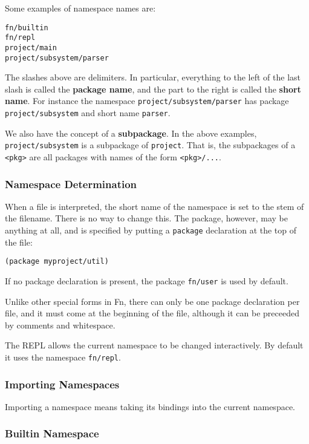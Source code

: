 \documentclass[11pt]{article}
\begin{document}
Some examples of namespace names are:
\begin{verbatim}
fn/builtin
fn/repl
project/main
project/subsystem/parser
\end{verbatim}

The slashes above are delimiters. In particular, everything to the left of the
last slash is called the \textbf{package name}, and the part to the right is called the
\textbf{short name}. For instance the namespace \texttt{project/subsystem/parser} has package
\texttt{project/subsystem} and short name \texttt{parser}.

We also have the concept of a \textbf{subpackage}. In the above examples,
\texttt{project/subsystem} is a subpackage of \texttt{project}. That is, the subpackages of a
\texttt{<pkg>} are all packages with names of the form \texttt{<pkg>/...}.


\subsubsection{Namespace Determination}
\label{sec:orgf0cd9c9}

When a file is interpreted, the short name of the namespace is set to the stem
of the filename. There is no way to change this. The package, however, may be
anything at all, and is specified by putting a \texttt{package} declaration at the top of
the file:

\begin{verbatim}
(package myproject/util)
\end{verbatim}

If no package declaration is present, the package \texttt{fn/user} is used by default.

Unlike other special forms in Fn, there can only be one package declaration per
file, and it must come at the beginning of the file, although it can be
preceeded by comments and whitespace.

The REPL allows the current namespace to be changed interactively. By default it
uses the namespace \texttt{fn/repl}.


\subsubsection{Importing Namespaces}
\label{sec:org532b7e4}

Importing a namespace means taking its bindings into the current namespace.


\subsubsection{Builtin Namespace}
\label{sec:org3370284}
\end{document}
